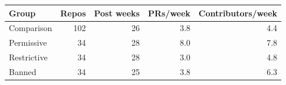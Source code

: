 \begin{tabular}{lrrrr}
\toprule
Group & Repos & Post weeks & PRs/week & Contributors/week \\
\midrule
Comparison & 102 & 26 & 3.8 & 4.4 \\
Permissive & 34 & 28 & 8.0 & 7.8 \\
Restrictive & 34 & 28 & 3.0 & 4.8 \\
Banned & 34 & 25 & 3.8 & 6.3 \\
\bottomrule
\end{tabular}
